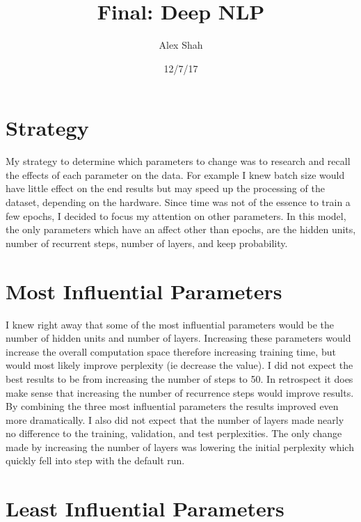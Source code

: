 \documentclass[10pt,a4paper]{article}
\begin{document}
\title{Final: Deep NLP}
\author{Alex Shah}
\date{12/7/17}

\maketitle

\section{Strategy}

My strategy to determine which parameters to change was to research and recall the effects of each parameter on the data. For example I knew batch size would have little effect on the end results but may speed up the processing of the dataset, depending on the hardware. Since time was not of the essence to train a few epochs, I decided to focus my attention on other parameters. In this model, the only parameters which have an affect other than epochs, are the hidden units, number of recurrent steps, number of layers, and keep probability.

\section{Most Influential Parameters}

I knew right away that some of the most influential parameters would be the number of hidden units and number of layers. Increasing these parameters would increase the overall computation space therefore increasing training time, but would most likely improve perplexity (ie decrease the value). I did not expect the best results to be from increasing the number of steps to 50. In retrospect it does make sense that increasing the number of recurrence steps would improve results. By combining the three most influential parameters the results improved even more dramatically. I also did not expect that the number of layers made nearly no difference to the training, validation, and test perplexities. The only change made by increasing the number of layers was lowering the initial perplexity which quickly fell into step with the default run.

\section{Least Influential Parameters}
\end{document}
